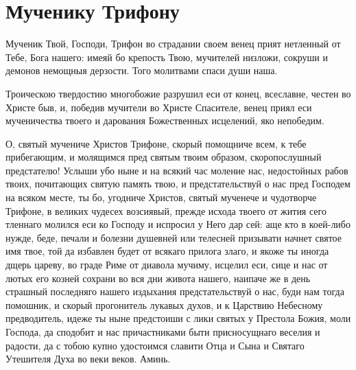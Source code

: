 \section{Мученику Трифону}\begin{mymulticols}


Мученик Твой, Господи, Трифон во страдании своем венец прият нетленный от Тебе, Бога нашего: имеяй бо крепость Твою, мучителей низложи, сокруши и демонов немощныя дерзости. Того молитвами спаси души наша.


Троическою твердостию многобожие разрушил еси от конец, всеславне, честен во Христе быв, и, победив мучители во Христе Спасителе, венец приял еси мученичества твоего и дарования Божественных исцелений, яко непобедим.


О, святый мучениче Христов Трифоне, скорый помощниче всем, к тебе прибегающим, и молящимся пред святым твоим образом, скоропослушный предстателю! Услыши убо ныне и на всякий час моление нас, недостойных рабов твоих, почитающих святую память твою, и предстательствуй о нас пред Господем на всяком месте, ты бо, угодниче Христов, святый мученече и чудотворче Трифоне, в великих чудесех возсиявый, прежде исхода твоего от жития сего тленнаго молился еси ко Господу и испросил у Него дар сей: аще кто в коей-либо нужде, беде, печали и болезни душевней или телесней призывати начнет святое имя твое, той да избавлен будет от всякаго прилога злаго, и якоже ты иногда дщерь цареву, во граде Риме от диавола мучиму, исцелил еси, сице и нас от лютых его козней сохрани во вся дни живота нашего, наипаче же в день страшный последняго нашего издыхания предстательствуй о нас, буди нам тогда помошник, и скорый прогонитель лукавых духов, и к Царствию Небесному предводитель, идеже ты ныне предстоиши с лики святых у Престола Божия, моли Господа, да сподобит и нас причастниками быти присносущнаго веселия и радости, да с тобою купно удостоимся славити Отца и Сына и Святаго Утешителя Духа во веки веков. Аминь.

\end{mymulticols}

